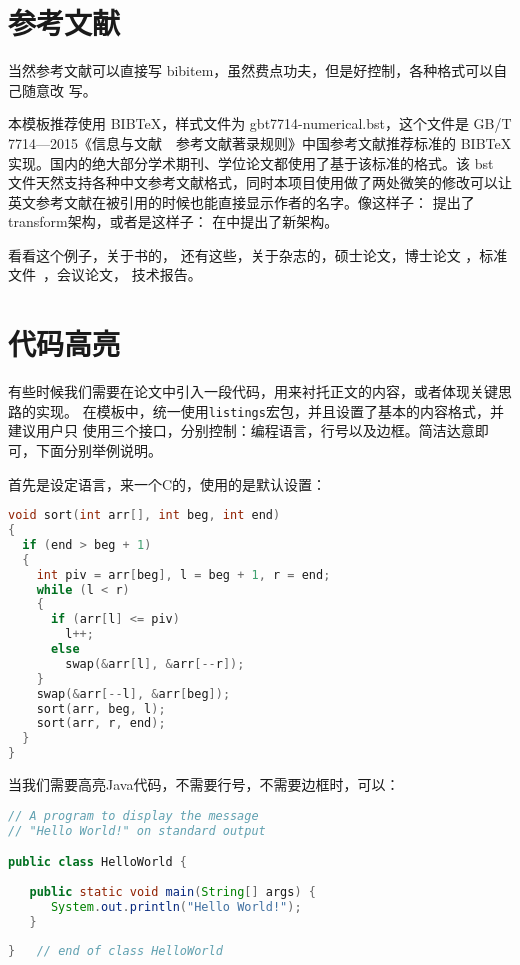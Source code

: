 \section{参考文献}
\label{sec:bib}
当然参考文献可以直接写 bibitem，虽然费点功夫，但是好控制，各种格式可以自己随意改
写。

本模板推荐使用 BIB\TeX，样式文件为 gbt7714-numerical.bst，这个文件是 GB/T 7714—2015《信息与文献 参考文献著录规则》中国参考文献推荐标准的 BIB\TeX 实现。国内的绝大部分学术期刊、学位论文都使用了基于该标准的格式。该 bst 文件天然支持各种中文参考文献格式，同时本项目使用做了两处微笑的修改可以让英文参考文献在被引用的时候也能直接显示作者的名字。像这样子： 
\citet{tsfm}提出了transform架构，或者是这样子： \citeauthor{tsfm}在\cite{tsfm}中提出了新架构。


看看这个例子，关于书的，
还有这些，关于杂志的，硕士论文，博士论文
，标准文件~，会议论文，%
技术报告。


\section{代码高亮}
有些时候我们需要在论文中引入一段代码，用来衬托正文的内容，或者体现关键思路的实现。
在模板中，统一使用\texttt{listings}宏包，并且设置了基本的内容格式，并建议用户只
使用三个接口，分别控制：编程语言，行号以及边框。简洁达意即可，下面分别举例说明。

首先是设定语言，来一个C的，使用的是默认设置：
\begin{lstlisting}[language=C]
void sort(int arr[], int beg, int end)
{
  if (end > beg + 1)
  {
    int piv = arr[beg], l = beg + 1, r = end;
    while (l < r)
    {
      if (arr[l] <= piv)
        l++;
      else
        swap(&arr[l], &arr[--r]);
    }
    swap(&arr[--l], &arr[beg]);
    sort(arr, beg, l);
    sort(arr, r, end);
  }
}
\end{lstlisting}

当我们需要高亮Java代码，不需要行号，不需要边框时，可以：
\begin{lstlisting}[language=Java,numbers=none,frame=none]
// A program to display the message
// "Hello World!" on standard output

public class HelloWorld {
 
   public static void main(String[] args) {
      System.out.println("Hello World!");
   }
      
}   // end of class HelloWorld
\end{lstlisting}

